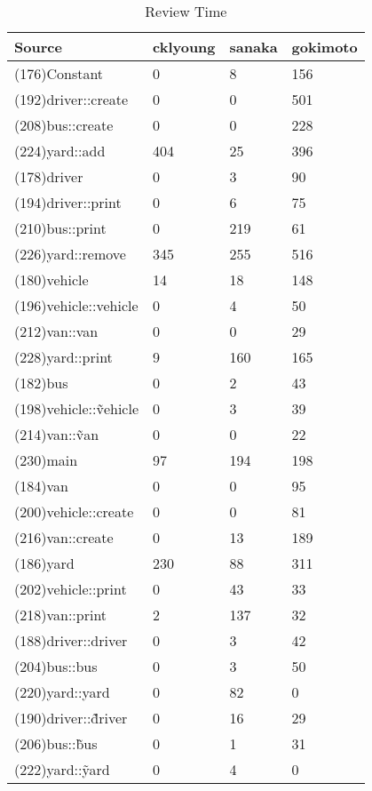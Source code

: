 \begin{table}[hb]
\begin{center}
\begin{tabular}{|l|l|l|l|}
\hline
Source & cklyoung & sanaka & gokimoto\\
\hline
(176)Constant & 0 & 8 & 156\\
(192)driver::create & 0 & 0 & 501\\
(208)bus::create & 0 & 0 & 228\\
(224)yard::add & 404 & 25 & 396\\
(178)driver & 0 & 3 & 90\\
(194)driver::print & 0 & 6 & 75\\
(210)bus::print & 0 & 219 & 61\\
(226)yard::remove & 345 & 255 & 516\\
(180)vehicle & 14 & 18 & 148\\
(196)vehicle::vehicle & 0 & 4 & 50\\
(212)van::van & 0 & 0 & 29\\
(228)yard::print & 9 & 160 & 165\\
(182)bus & 0 & 2 & 43\\
(198)vehicle::\~vehicle & 0 & 3 & 39\\
(214)van::\~van & 0 & 0 & 22\\
(230)main & 97 & 194 & 198\\
(184)van & 0 & 0 & 95\\
(200)vehicle::create & 0 & 0 & 81\\
(216)van::create & 0 & 13 & 189\\
(186)yard & 230 & 88 & 311\\
(202)vehicle::print & 0 & 43 & 33\\
(218)van::print & 2 & 137 & 32\\
(188)driver::driver & 0 & 3 & 42\\
(204)bus::bus & 0 & 3 & 50\\
(220)yard::yard & 0 & 82 & 0\\
(190)driver::\~driver & 0 & 16 & 29\\
(206)bus::\~bus & 0 & 1 & 31\\
(222)yard::\~yard & 0 & 4 & 0\\
\hline
\end{tabular}
\end{center}
\caption{Review Time}
\end{table}


